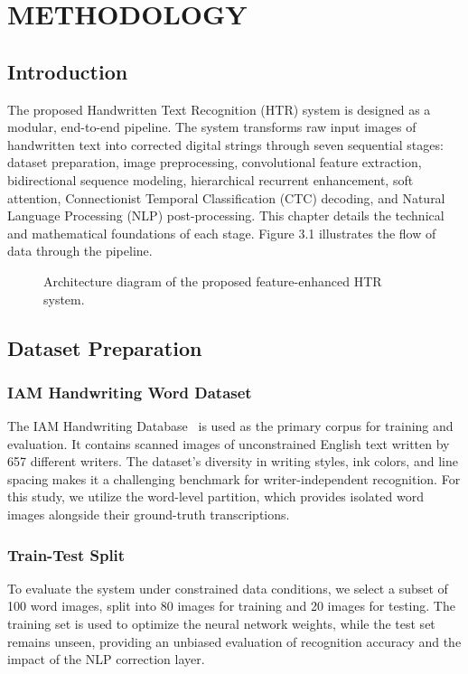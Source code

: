 
\chapter{METHODOLOGY}
\label{ch:methodology}

\section{Introduction}
The proposed Handwritten Text Recognition (HTR) system is designed as a modular, end-to-end pipeline. The system transforms raw input images of handwritten text into corrected digital strings through seven sequential stages: dataset preparation, image preprocessing, convolutional feature extraction, bidirectional sequence modeling, hierarchical recurrent enhancement, soft attention, Connectionist Temporal Classification (CTC) decoding, and Natural Language Processing (NLP) post-processing. This chapter details the technical and mathematical foundations of each stage. Figure 3.1 illustrates the flow of data through the pipeline.

\begin{figure}[h!]
    \centering
    \vspace{2cm} %
    \caption{Architecture diagram of the proposed feature-enhanced HTR system.}
    \label{fig:pipeline}
\end{figure}

\section{Dataset Preparation}
\subsection{IAM Handwriting Word Dataset}
The IAM Handwriting Database~\cite{marti2002iam} is used as the primary corpus for training and evaluation. It contains scanned images of unconstrained English text written by 657 different writers. The dataset's diversity in writing styles, ink colors, and line spacing makes it a challenging benchmark for writer-independent recognition. For this study, we utilize the word-level partition, which provides isolated word images alongside their ground-truth transcriptions.

\subsection{Train-Test Split}
To evaluate the system under constrained data conditions, we select a subset of 100 word images, split into 80 images for training and 20 images for testing. The training set is used to optimize the neural network weights, while the test set remains unseen, providing an unbiased evaluation of recognition accuracy and the impact of the NLP correction layer.

